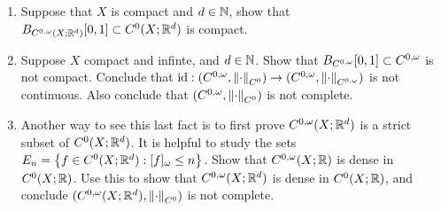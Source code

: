 \documentclass[a4paper]{article}
\begin{document}
{\begin{enumerate}
  \item Suppose that $X$ is compact and $d \in \mathbb{N}$, show that 
  $B_{C^{0, \omega}(X; \mathbb{R}^d)} [0, 1] \subset C^0(X; \mathbb{R}^d)$
  is compact.

  \item Suppose $X$ compact and infinte, and $d \in \mathbb{N}$.
  Show that $B_{{C^{0, \omega}}}[0,1] \subset {C^{0, \omega}}$ is not compact.
  Conclude that $\operatorname{id}: ({C^{0, \omega}}, \left\lVert \cdot\right\rVert_{C^0}) \to ({C^{0, \omega}}, \left\lVert \cdot\right\rVert_{{C^{0, \omega}}})$
  is not continuous. Also conclude that $({C^{0, \omega}}, \left\lVert \cdot\right\rVert_{C^0})$ 
  is not complete.

  \item Another way to see this last fact is to first prove 
  ${C^{0, \omega}}(X; \mathbb{R}^d)$ is a strict subset of $C^0(X; \mathbb{R}^d)$. It is helpful 
  to study the sets $E_n = \left\{ f \in C^0(X; \mathbb{R}^d) : [f]_\omega \leq n \right\}$.
  Show that ${C^{0, \omega}}(X; \mathbb{R})$ is dense in $C^0(X; \mathbb{R})$. 
  Use this to show that ${C^{0, \omega}}(X; \mathbb{R}^d)$ is dense in $C^0(X; \mathbb{R})$,
  and conclude $({C^{0, \omega}}(X; \mathbb{R}^d), \left\lVert \cdot\right\rVert_{C^0})$ 
  is not complete.
\end{enumerate}
}
\end{document}
